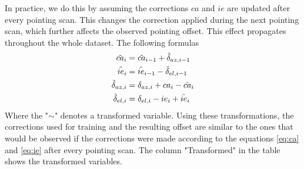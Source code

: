 In practice, we do this by assuming the corrections $ca$ and $ie$ are updated after every pointing scan.
This changes the correction applied during the next pointing scan, which further affects the observed pointing offset.
This effect propagates throughout the whole dataset.
The following formulas 
\begin{align}
    \Tilde{ca}_i &= \Tilde{ca}_{i-1} + \Tilde{\delta}_{az,i-1}\label{eq:ca_tilde}\\
    \Tilde{ie}_i &= \Tilde{ie}_{i-1} - \Tilde{\delta}_{el,i-1}\label{eq:ie_tilde}\\
    \Tilde{\delta}_{az,i} &= \delta_{az,i} + ca_i - \Tilde{ca}_i\label{eq:off_az_tilde}\\
    \Tilde{\delta}_{el,i} &= \delta_{el,i} - ie_i + \Tilde{ie}_i\label{eq:off_el_tilde}
\end{align}
Where the "$\sim$" denotes a transformed variable.
Using these transformations,
the corrections used for training and the resulting offset are similar to the ones that would be observed if the corrections were made according to the equations
\eqref{eq:ca} and \eqref{eq:ie} after every pointing scan. The column "Transformed" in the table shows the transformed variables.

